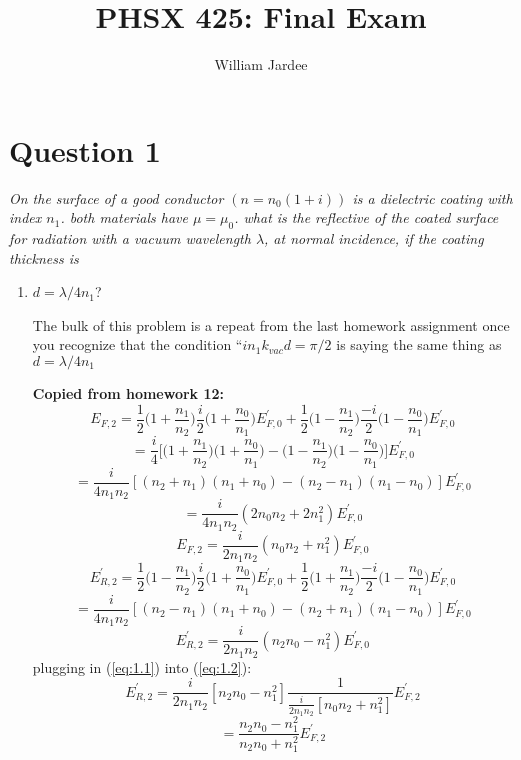 \documentclass[12pt]{article}
\begin{document}
\title{PHSX 425: Final Exam}
\author{William Jardee}
\maketitle

\noindent

\section*{Question 1}
{\sl On the surface of a good conductor $(n = n_0(1+i))$ is a dielectric coating with index $n_1$. both materials have $\mu = \mu_0$. what is the reflective of the coated surface for radiation with a vacuum wavelength $\lambda$, at normal incidence, if the coating thickness is}

\begin{enumerate}[label=\alph*)]
\item $d = \lambda/4n_1$? \smallskip

The bulk of this problem is a repeat from the last homework assignment once you recognize that the condition ``$in_1k_{vac}d = \pi/2$ is saying the same thing as $d = \lambda/4n_1$

{\bf Copied from homework 12:}
\[E_{F,2} = \frac{1}{2}\Big(1 + \frac{n_1}{n_2}\Big)\frac{i}{2}\Big(1+\frac{n_0}{n_1}\Big)E^\prime_{F,0}
+ \frac{1}{2}\Big(1 - \frac{n_1}{n_2}\Big)\frac{-i}{2}\Big(1-\frac{n_0}{n_1}\Big)E^\prime_{F,0}\]
\[= \frac{i}{4}\Big[\Big(1+\frac{n_1}{n_2}\Big)\Big(1+\frac{n_0}{n_1}\Big) - \Big(1-\frac{n_1}{n_2}\Big)\Big(1-\frac{n_0}{n_1}\Big)\Big]E^\prime_{F,0}\]
\[= \frac{i}{4n_1n_2}[(n_2 + n_1)(n_1 + n_0) - (n_2-n_1)(n_1-n_0)]E^\prime_{F,0}\]
\[= \frac{i}{4n_1n_2}(2n_0n_2+2n_1^2)E^\prime_{F,0}\]
\begin{equation}
E_{F,2} = \frac{i}{2n_1n_2}(n_0n_2 + n_1^2)E^\prime_{F,0}
\label{eq:1.1}
\end{equation}\bigskip
\[E^\prime_{R,2} = \frac{1}{2}\Big(1-\frac{n_1}{n_2}\Big)\frac{i}{2}\Big(1+\frac{n_0}{n_1}\Big)E^\prime_{F,0}
+ \frac{1}{2}\Big(1+\frac{n_1}{n_2}\Big)\frac{-i}{2}\Big(1-\frac{n_0}{n_1}\Big)E^\prime_{F,0}\]
\[=\frac{i}{4n_1n_2}[(n_2-n_1)(n_1+n_0)- (n_2+n_1)(n_1-n_0)]E^\prime_{F,0}\]
\begin{equation}
E^\prime_{R,2} = \frac{i}{2n_1n_2}(n_2n_0-n_1^2)E^\prime_{F,0}
\label{eq:1.2}
\end{equation}\bigskip
plugging in (\ref{eq:1.1}) into (\ref{eq:1.2}):
\[E^\prime_{R,2} = \frac{i}{2n_1n_2}[n_2n_0 - n_1^2]\frac{1}{\frac{i}{2n_1n_2}[n_0n_2 + n_1^2]}E^\prime_{F,2}\]
\[= \frac{n_2n_0 - n_1^2}{n_2n_0 + n_1^2}E^\prime_{F,2}\]


\end{enumerate}
\end{document}
